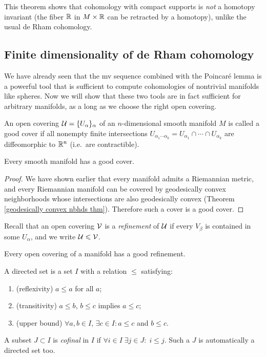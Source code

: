 \begin{rem}
    This theorem shows that cohomology with compact supports is \emph{not} a homotopy invariant (the fiber $\mathbb{R}$ in $M\times\mathbb{R}$ can be retracted by a homotopy), unlike the usual de Rham cohomology.
\end{rem}


\subsection{Finite dimensionality of de Rham cohomology}\label{finite dim de rham}

We have already seen that the \gls{mv} sequence combined with the Poincar\'e lemma is a powerful tool that is sufficient to compute cohomologies of nontrivial manifolds like spheres. Now we will show that these two tools are in fact sufficient for arbitrary manifolds, as a long as we choose the right open covering.

\begin{defn}
    An open covering $\mathcal{U}=\{U_\alpha\}_\alpha$ of an $n$-dimensional smooth manifold $M$ is called a good cover if all nonempty finite intersections $U_{\alpha_1\cdots\alpha_k}=U_{\alpha_1}\cap \cdots\cap U_{\alpha_k}$ are diffeomorphic to $\mathbb{R}^n$ (i.e.\ are contractible).
\end{defn}

\begin{prop}
    Every smooth manifold has a good cover.
\end{prop}
\begin{proof}
     We have shown earlier that every manifold admits a Riemannian metric, and every Riemannian manifold can be covered by geodesically convex neighborhoods whose intersections are also geodesically convex (Theorem \ref{geodesically convex nbhds thm}). Therefore such a cover is a good cover.
\end{proof}

Recall that an open covering $\mathcal{V}$ is a \emph{refinement} of $\mathcal{U}$ if every $V_\beta$ is contained in some $U_\alpha$, and we write $\mathcal{U}\leqslant \mathcal{V}$.

\begin{cor}
    Every open covering of a manifold has a good refinement.
\end{cor}

\begin{defn}
    A directed set is a set $I$ with a relation $\leq $ satisfying:
    \begin{enumerate}
        \item (reflexivity) $a\leq a$ for all $a$;
        \item (transitivity) $a\leq b$, $b\leq c$ implies $a\leq c$;
        \item (upper bound) $\forall a,b\in I$, $\exists c\in I: a\leq c$ and $b\leq c$.
    \end{enumerate}
    A subset $J\subset I$ is \emph{cofinal} in $I$ if  $\forall i\in I\; \exists j\in J:\; i\leq j$. Such a $J$ is automatically a directed set too.
\end{defn}

